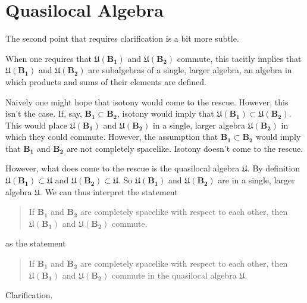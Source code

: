\section{Quasilocal Algebra}\label{sctn:quasilocal-algebra}
The second point that requires clarification is a bit more subtle.

When one requires that $\mathfrak{U}(\mathbf{B_1})$ and $\mathfrak{U}(\mathbf{B_2})$ commute, this tacitly implies that $\mathfrak{U}(\mathbf{B_1})$ and $\mathfrak{U}(\mathbf{B_2})$ are subalgebras of a single, larger algebra, an algebra in which products and sums of their elements are defined.

Naively one might hope that isotony would come to the rescue. However, this isn't the case. If, say, $\mathbf{B_1} \subset \mathbf{B_2}$, isotony would imply that $\mathfrak{U}(\mathbf{B_1}) \subset \mathfrak{U}(\mathbf{B_2})$. This would place $\mathfrak{U}(\mathbf{B_1})$ and $\mathfrak{U}(\mathbf{B_2})$ in a single, larger algebra $\mathfrak{U}(\mathbf{B_2})$ in which they could commute. However, the assumption that $\mathbf{B_1} \subset \mathbf{B_2}$ would imply that $\mathbf{B_1}$ and $\mathbf{B_2}$ are not completely spacelike.  Isotony doesn't come to the rescue.

However, what does come to the rescue is the quasilocal algebra $\mathfrak{U}$. By definition $\mathfrak{U}(\mathbf{B_1}) \subset \mathfrak{U}$ and $\mathfrak{U}(\mathbf{B_2}) \subset \mathfrak{U}$. So $\mathfrak{U}(\mathbf{B_1})$ and $\mathfrak{U}(\mathbf{B_2})$ are in a single, larger algebra $\mathfrak{U}$. We can thus interpret the statement

\begin{quote}
    If $\mathbf{B_1}$ and $\mathbf{B_2}$ are completely spacelike with respect to each other, then $\mathfrak{U}(\mathbf{B_1})$ and $\mathfrak{U}(\mathbf{B_2})$ commute.
\end{quote}

as the statement

\begin{quote}
    If $\mathbf{B_1}$ and $\mathbf{B_2}$ are completely spacelike with respect to each other, then $\mathfrak{U}(\mathbf{B_1})$ and $\mathfrak{U}(\mathbf{B_2})$ commute in the quasilocal algebra $\mathfrak{U}$.
\end{quote}

Clarification.
